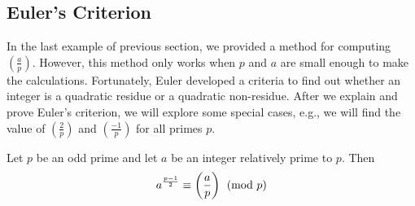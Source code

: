 \subsection{Euler's Criterion}
In the last example of previous section, we provided a method for computing $ \left(\frac{a}{p}\right)$. However, this method only works when $p$ and $a$ are small enough to make the calculations. Fortunately, Euler developed a criteria  to find out whether an integer is a quadratic residue or a quadratic non-residue. After we explain and prove Euler's criterion, we will explore some special cases, e.g., we will find the value of $ \left(\frac{2}{p}\right)$ and $ \left(\frac{-1}{p}\right)$ for all primes $p$.

\begin{theorem}
	\label{thm:eulerscriterion}
	Let $p$ be an odd prime and let $a$ be an integer relatively prime to $p$. Then
	\begin{align*}
		a^{\frac{p-1}{2}} \equiv \left(\dfrac{a}{p}\right) \pmod p
	\end{align*}
\end{theorem}

